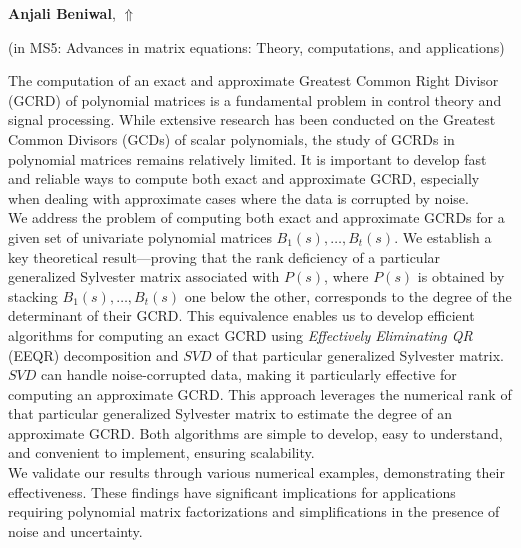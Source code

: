 \documentclass[ILAS2025-program.tex]{subfiles}
\begin{document}
\hypertarget{down0365}{}\begin{ilasabstract}
    
\textbf{Anjali Beniwal},  \hfill \hyperlink{up0365}{$\Uparrow$}
    
    
(in {\color{mstitle}MS5: Advances in matrix equations: Theory, computations, and applications})
        
\mtskip
    The computation of an exact and approximate Greatest Common Right Divisor (GCRD) of polynomial matrices is a fundamental problem in control theory and signal processing. While extensive research has been conducted on the Greatest Common Divisors (GCDs) of scalar polynomials, the study of GCRDs in polynomial matrices remains relatively limited. It is important to develop fast and reliable ways to compute both exact and approximate GCRD, especially when dealing with approximate cases where the data is corrupted by noise.\\
We address the problem of computing both exact and approximate GCRDs for a given set of univariate polynomial matrices $B_1(s), \dots, B_t(s)$. We establish a key theoretical result—proving that the rank deficiency of a particular generalized Sylvester matrix associated with $P(s)$, where $P(s)$ is obtained by stacking $B_1(s), \dots, B_t(s)$ one below the other, corresponds to the degree of the determinant of their GCRD. This equivalence enables us to develop efficient algorithms for computing an exact GCRD using \textit{Effectively Eliminating QR} (EEQR) decomposition and $SVD$ of that particular generalized Sylvester matrix. $SVD$ can handle noise-corrupted data, making it particularly effective for computing an approximate GCRD. This approach leverages the numerical rank of that particular generalized Sylvester matrix to estimate the degree of an approximate GCRD. Both algorithms are simple to develop, easy to understand, and convenient to implement, ensuring scalability.\\
We validate our results through various numerical examples, demonstrating their effectiveness. These findings have significant implications for applications requiring polynomial matrix factorizations and simplifications in the presence of noise and uncertainty.
\end{ilasabstract}
    
\end{document}
